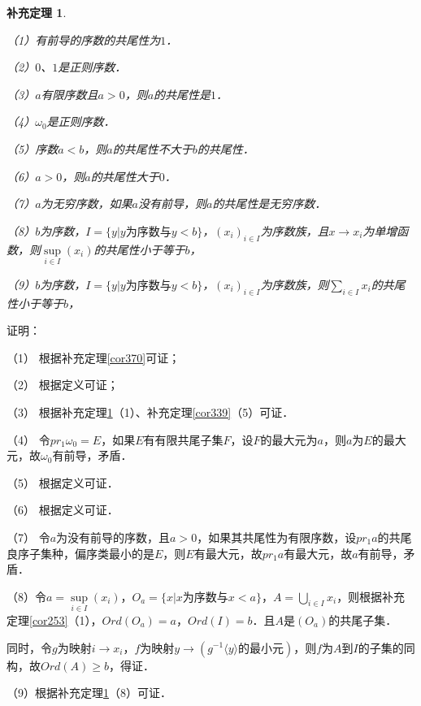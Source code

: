 \documentclass[12pt, a4paper, oneside]{book}
\newtheorem{cor}{补充定理}
\begin{document}
			\begin{cor}\label{cor371}
				\hfill\par
				（1）有前导的序数的共尾性为$1$．
				\par
				（2）$0$、$1$是正则序数．
				\par
				（3）$a$有限序数且$a>0$，则$a$的共尾性是$1$．
				\par
				（4）$\omega_0$是正则序数．
				\par
				（5）序数$a<b$，则$a$的共尾性不大于$b$的共尾性．
				\par
				（6）$a>0$，则$a$的共尾性大于$0$．
				\par
				（7）$a$为无穷序数，如果$a$没有前导，则$a$的共尾性是无穷序数．
				\par
				（8）$b$为序数，$I=\{y|y\text{为序数}\text{与}y<b\}$，$(x_i)_{i\in I}$为序数族，且$x\to x_i$为单增函数，则$\mathop{sup}\limits_{i\in I}(x_i)$的共尾性小于等于$b$，
				\par
				（9）$b$为序数，$I=\{y|y\text{为序数}\text{与}y<b\}$，$(x_i)_{i\in I}$为序数族，则$\sum\limits_{i\in I}x_i$的共尾性小于等于$b$，
			\end{cor}
			证明：
			\par
			（1）	根据补充定理\ref{cor370}可证；
			\par
			（2）	根据定义可证；
			\par
			（3）	根据补充定理\ref{cor371}（1）、补充定理\ref{cor339}（5）可证．
			\par
			（4）	令$pr_1\omega_0=E$，如果$E$有有限共尾子集$F$，设$F$的最大元为$a$，则$a$为$E$的最大元，故$\omega_0$有前导，矛盾．
			\par
			（5）	根据定义可证．
			\par
			（6）	根据定义可证．
			\par
			（7）	令$a$为没有前导的序数，且$a>0$，如果其共尾性为有限序数，设$pr_1a$的共尾良序子集种，偏序类最小的是$E$，则$E$有最大元，故$pr_1a$有最大元，故$a$有前导，矛盾．
			\par
			（8）令$a=\mathop{sup}\limits_{i\in I}(x_i)$，$O_a=\{x|x\text{为序数}\text{与}x<a\}$，$A=\bigcup\limits_{i\in I}x_i$，则根据补充定理\ref{cor253}（1），$Ord(O_a)=a$，$Ord(I)=b$．且$A$是$(O_a)$的共尾子集．
			\par
			同时，令$g$为映射$i\to x_i$，$f$为映射$y\to (g^{-1}\langle y \rangle \text{的最小元})$，则$f$为$A$到$I$的子集的同构，故$Ord(A)\geq b$，得证．
			\par
			（9）根据补充定理\ref{cor371}（8）可证．
			
\end{document}

